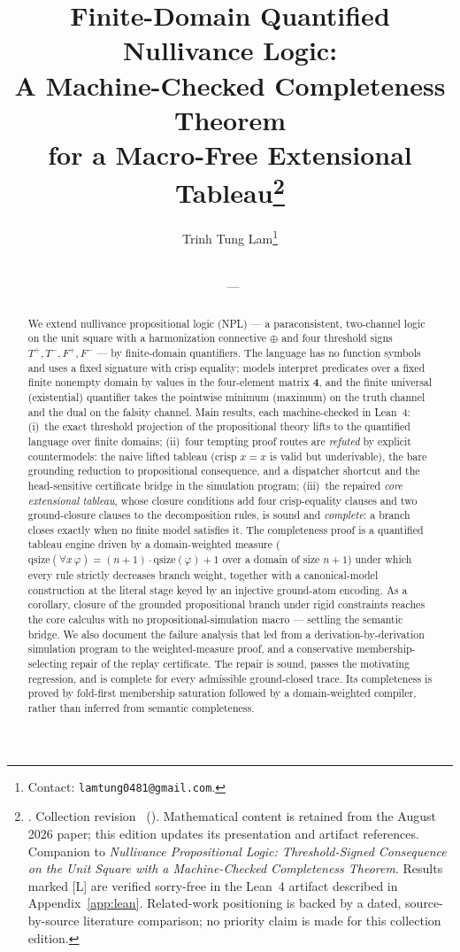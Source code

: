 \documentclass[11pt,a4paper]{article}
\title{Finite-Domain Quantified Nullivance Logic:\\
A Machine-Checked Completeness Theorem\\
for a Macro-Free Extensional Tableau\thanks{%
\PublicationPart. Collection revision \PublicationVersion\ (\PublicationDate).
Mathematical content is retained from the August 2026 paper; this edition
updates its presentation and artifact references. Companion to \emph{Nullivance Propositional Logic:
Threshold-Signed Consequence on the Unit Square with a Machine-Checked
Completeness Theorem}. Results
marked [L] are verified sorry-free in the Lean~4 artifact described in
Appendix~\ref{app:lean}. Related-work positioning is backed by a dated,
source-by-source literature comparison; no priority claim is made for this
collection edition.}}
\author{Trinh Tung Lam\thanks{Contact: \texttt{lamtung0481@gmail.com}.}}
\date{\PublicationDate\\\small \PublicationPart\ --- \PublicationVersion}
\theoremstyle{definition}
\newcommand{\FOUR}{\mathbf{4}}
\newcommand{\hmz}{\oplus}
\newcommand{\Tp}{T^{+}}\newcommand{\Tm}{T^{-}}
\newcommand{\Fp}{F^{+}}\newcommand{\Fm}{F^{-}}
\newcommand{\qsize}{\mathrm{qsize}}
\begin{document}
\maketitle

\begin{abstract}
We extend nullivance propositional logic (NPL) --- a paraconsistent,
two-channel logic on the unit square with a harmonization connective $\hmz$
and four threshold signs $\Tp,\Tm,\Fp,\Fm$ --- by finite-domain quantifiers.
The language has no function symbols and uses a fixed signature with crisp equality; models
interpret predicates over a fixed finite nonempty domain by values in the
four-element matrix $\FOUR$, and the finite universal (existential)
quantifier takes the pointwise minimum (maximum) on the truth channel and
the dual on the falsity channel. Main results, each machine-checked in
Lean~4: (i)~the exact threshold projection of the propositional theory
lifts to the quantified language over finite domains; (ii)~four tempting
proof routes are \emph{refuted} by explicit countermodels: the naive
lifted tableau (crisp $x{=}x$ is valid but underivable), the bare
grounding reduction to propositional consequence, and a dispatcher
shortcut and the head-sensitive certificate bridge in the simulation
program; (iii)~the
repaired \emph{core extensional tableau}, whose closure conditions add
four crisp-equality clauses and two ground-closure clauses to the
decomposition rules, is sound and \emph{complete}: a branch closes exactly
when no finite model satisfies it. The completeness proof is a quantified
tableau engine driven by a domain-weighted measure
($\qsize(\forall x\,\varphi)=(n{+}1)\cdot\qsize(\varphi)+1$ over a domain
of size $n{+}1$) under which every rule strictly decreases branch weight,
together with a canonical-model construction at the literal stage keyed by
an injective ground-atom encoding. As a corollary, closure of the grounded
propositional branch under rigid constraints reaches the core calculus with
no propositional-simulation macro --- settling the semantic bridge. We
also document the failure analysis that led from a derivation-by-derivation
simulation program to the weighted-measure proof, and a conservative
membership-selecting repair of the replay certificate. The repair is
sound, passes the motivating regression, and is complete for every
admissible ground-closed trace. Its completeness is proved by fold-first
membership saturation followed by a domain-weighted compiler, rather than
inferred from semantic completeness.
\end{abstract}
\end{document}

